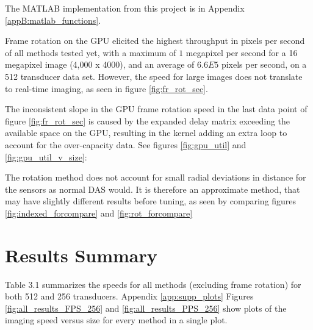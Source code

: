     The MATLAB implementation from this project is in Appendix \ref{appB:matlab_functions}.

    Frame rotation on the GPU elicited the highest throughput in pixels per second of all methods tested yet, with a maximum of $1$ megapixel per second for a 16 megapixel image (4,000 x 4000), and an average of $6.6E5$ pixels per second, on a 512 transducer data set. However, the speed for large images does not translate to real-time imaging, as seen in figure \ref{fig:fr_rot_sec}.


    The inconsistent slope in the GPU frame rotation speed in the last data point of figure \ref{fig:fr_rot_sec} is caused by the expanded delay matrix exceeding the available space on the GPU, resulting in the kernel adding an extra loop to account for the over-capacity data. See figures \ref{fig:gpu_util} and \ref{fig:gpu_util_v_size}:


    The rotation method does not account for small radial deviations in distance for the sensors as normal DAS would. It is therefore an approximate method, that may have slightly different results before tuning, as seen by comparing figures \ref{fig:indexed_forcompare} and \ref{fig:rot_forcompare}



\section{Results Summary}
\label{chapter3:summary}

Table 3.1 summarizes the speeds for all methods (excluding frame rotation) for both 512 and 256 transducers. Appendix \ref{app:supp_plots} Figures \ref{fig:all_results_FPS_256} and \ref{fig:all_results_PPS_256} show plots of the imaging speed versus size for every method in a single plot.

